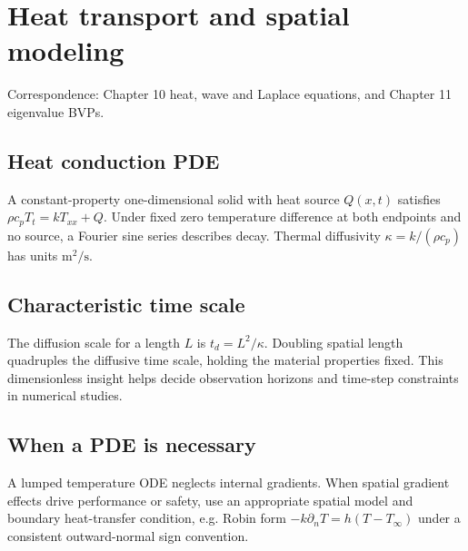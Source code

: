 \documentclass[11pt,letterpaper,oneside]{report}
\theoremstyle{definition}\newtheorem{definition}[theorem]{Definition}
\theoremstyle{remark}\newtheorem{remark}[theorem]{Remark}
\begin{document}
\chapter{Heat transport and spatial modeling}
\begin{bookground}Correspondence: Chapter 10 heat, wave and Laplace equations, and Chapter 11 eigenvalue BVPs.\end{bookground}
\section{Heat conduction PDE}
A constant-property one-dimensional solid with heat source $Q(x,t)$ satisfies $\rho c_p T_t=k T_{xx}+Q$. Under fixed zero temperature difference at both endpoints and no source, a Fourier sine series describes decay. Thermal diffusivity $\kappa=k/(\rho c_p)$ has units $\mathrm{m^2/s}$.
\section{Characteristic time scale}
The diffusion scale for a length $L$ is $t_d=L^2/\kappa$. Doubling spatial length quadruples the diffusive time scale, holding the material properties fixed. This dimensionless insight helps decide observation horizons and time-step constraints in numerical studies.
\section{When a PDE is necessary}
A lumped temperature ODE neglects internal gradients. When spatial gradient effects drive performance or safety, use an appropriate spatial model and boundary heat-transfer condition, e.g. Robin form $-k\partial_n T=h(T-T_\infty)$ under a consistent outward-normal sign convention.
\end{document}
